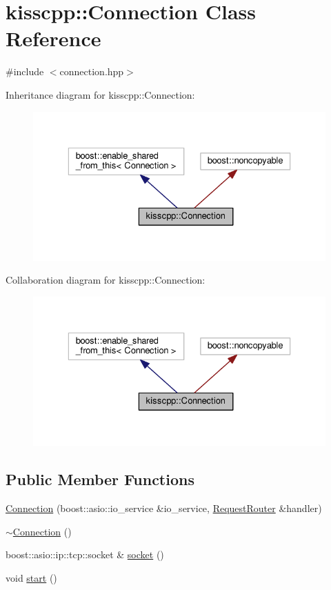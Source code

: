\hypertarget{a00022}{\section{kisscpp\-:\-:Connection Class Reference}
\label{a00022}
}


{\ttfamily \#include $<$connection.\-hpp$>$}



Inheritance diagram for kisscpp\-:\-:Connection\-:\nopagebreak
\begin{figure}[H]
\begin{center}
\leavevmode
\includegraphics[width=329pt]{a00141}
\end{center}
\end{figure}


Collaboration diagram for kisscpp\-:\-:Connection\-:\nopagebreak
\begin{figure}[H]
\begin{center}
\leavevmode
\includegraphics[width=329pt]{a00142}
\end{center}
\end{figure}
\subsection*{Public Member Functions}
\begin{DoxyCompactItemize}
\item 
\hyperlink{a00022_aa1cd7b458cc101092c9a83c4618e6f4e}{Connection} (boost\-::asio\-::io\-\_\-service \&io\-\_\-service, \hyperlink{a00038}{Request\-Router} \&handler)
\item 
\hyperlink{a00022_acdc21c339ec95978cf74f38c395430dd}{$\sim$\-Connection} ()
\item 
boost\-::asio\-::ip\-::tcp\-::socket \& \hyperlink{a00022_af8fa26370281f97e44bc05a669c7f040}{socket} ()
\item 
void \hyperlink{a00022_aaad88f72fad4844f03e5dd55320caeae}{start} ()
\end{DoxyCompactItemize}


